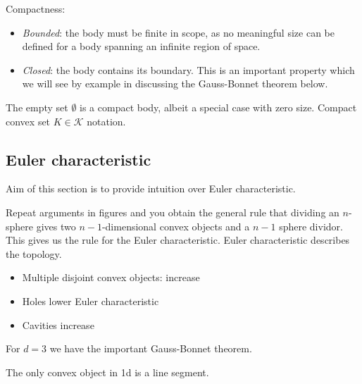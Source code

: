 Compactness:
\begin{itemize}
\item \emph{Bounded}: the body must be finite in scope, as no meaningful size can be defined for a body spanning an infinite region of space.
\item \emph{Closed}: the body contains its boundary.
  This is an important property which we will see by example in discussing the Gauss-Bonnet theorem below.
\end{itemize}
The empty set $\emptyset$ is a compact body, albeit a special case with zero size.
Compact convex set $K \in \mathcal{K}$ notation.

\subsection{Euler characteristic}

Aim of this section is to provide intuition over Euler characteristic.

Repeat arguments in figures and you obtain the general rule that dividing an $n$-sphere gives two $n-1$-dimensional convex objects and a $n-1$ sphere dividor.
This gives us the rule for the Euler characteristic.
Euler characteristic describes the topology.

\begin{itemize}
\item Multiple disjoint convex objects: increase
\item Holes lower Euler characteristic
\item Cavities increase
\end{itemize}

For $d=3$ we have the important Gauss-Bonnet theorem.

The only convex object in 1d is a line segment.



